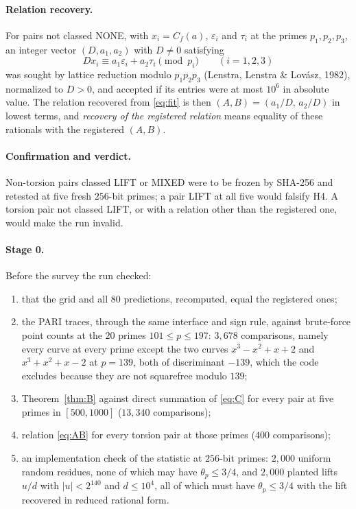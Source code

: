 \documentclass[11pt,a4paper]{article}
\numberwithin{equation}{section}
\theoremstyle{plain}
\theoremstyle{definition}
\newcommand{\eps}{\varepsilon}
\begin{document}
\paragraph{Relation recovery.} For pairs not classed NONE, with $x_i=C_f(a)$, $\eps_i$ and $\tau_i$ at the primes $p_1,p_2,p_3$, an integer vector $(D,a_1,a_2)$ with $D\neq0$ satisfying
\begin{equation}\label{eq:fit}
Dx_i\equiv a_1\eps_i+a_2\tau_i\pmod{p_i}\qquad(i=1,2,3)
\end{equation}
was sought by lattice reduction modulo $p_1p_2p_3$ (Lenstra, Lenstra \& Lov\'asz, 1982), normalized to $D>0$, and accepted if its entries were at most $10^6$ in absolute value. The relation recovered from \eqref{eq:fit} is then $(A,B)=(a_1/D,\,a_2/D)$ in lowest terms, and \emph{recovery of the registered relation} means equality of these rationals with the registered $(A,B)$.

\paragraph{Confirmation and verdict.} Non-torsion pairs classed LIFT or MIXED were to be frozen by SHA-256 and retested at five fresh $256$-bit primes; a pair LIFT at all five would falsify H4. A torsion pair not classed LIFT, or with a relation other than the registered one, would make the run invalid.

\paragraph{Stage 0.} Before the survey the run checked:
\begin{enumerate}[label=(\alph*),leftmargin=2em,itemsep=1pt]
\item that the grid and all $80$ predictions, recomputed, equal the registered ones;
\item the PARI traces, through the same interface and sign rule, against brute-force point counts at the $20$ primes $101\le p\le197$: $3{,}678$ comparisons, namely every curve at every prime except the two curves $x^3-x^2+x+2$ and $x^3+x^2+x-2$ at $p=139$, both of discriminant $-139$, which the code excludes because they are not squarefree modulo $139$;
\item Theorem~\ref{thm:B} against direct summation of \eqref{eq:C} for every pair at five primes in $[500,1000]$ ($13{,}340$ comparisons);
\item relation \eqref{eq:AB} for every torsion pair at those primes ($400$ comparisons);
\item an implementation check of the statistic at $256$-bit primes: $2{,}000$ uniform random residues, none of which may have $\theta_p\le3/4$, and $2{,}000$ planted lifts $u/d$ with $|u|<2^{140}$ and $d\le10^4$, all of which must have $\theta_p\le3/4$ with the lift recovered in reduced rational form.
\end{enumerate}
\end{document}
